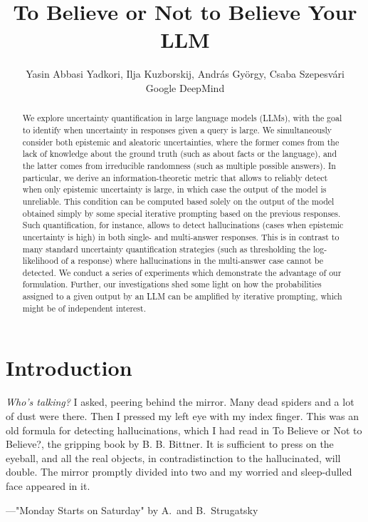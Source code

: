 \documentclass[a4paper]{article}
\theoremstyle{plain}
\theoremstyle{definition}
\theoremstyle{plain}
\begin{document}
\title{\LARGE \bf
To Believe or Not to Believe Your LLM
}
\author{Yasin Abbasi Yadkori, Ilja Kuzborskij, Andr\'{a}s Gy\"{o}rgy, Csaba Szepesv\'{a}ri\\
Google DeepMind}

\maketitle

\begin{abstract}
%
  We explore uncertainty quantification in large language models (LLMs), with the goal to identify when uncertainty in responses given a query is large. We simultaneously consider both epistemic and aleatoric uncertainties, where the former comes from the lack of knowledge about the ground truth (such as about facts or the language), and the latter comes from irreducible randomness (such as multiple possible answers). In particular, we derive an information-theoretic metric that allows to reliably detect when only epistemic uncertainty is large, in which case the output of the model is unreliable. This condition can be computed based solely on the output of the model obtained simply by some special iterative prompting based on the previous responses. Such quantification, for instance, allows to detect hallucinations (cases when epistemic uncertainty is high) in both single- and multi-answer responses. This is in contrast to many standard uncertainty quantification strategies (such as thresholding the log-likelihood of a response) where hallucinations in the multi-answer case cannot be detected. We conduct a series of experiments which demonstrate the advantage of our formulation. Further, our investigations shed some light on how the probabilities assigned to a given output by an LLM can be amplified by iterative prompting, which might be of independent interest.
\end{abstract}

\section{Introduction}

\begin{adjustwidth}{1cm}{1cm} %
\begin{displayquote}
  \emph{Who's talking?} I asked, peering behind the mirror. Many dead spiders and a lot of dust were there. Then I pressed my left eye with my index finger. This was an old formula for detecting hallucinations, which I had read in To Believe or Not to Believe?, the gripping book by B. B. Bittner. It is sufficient to press on the eyeball, and all the real objects, in contradistinction to the hallucinated, will double. The mirror promptly divided into two and my worried and sleep-dulled face appeared in it.
\end{displayquote}
\end{adjustwidth}
\hfill
\hspace*{\fill}---"Monday Starts on Saturday" by A.\ and B.\ Strugatsky
\end{document}

